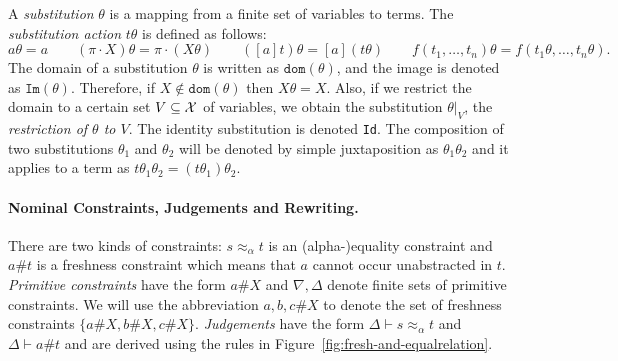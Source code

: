 \documentclass[submission,copyright,creativecommons]{eptcs}
\newcommand{\daniele}[1]{\textcolor{cyan}{#1}}
\newcommand{\aleq}{\approx_{\alpha}}
\newcommand{\alert}[1]{\textcolor{red}{#1}}
\theoremstyle{plain}
\theoremstyle{definition}
\newtheorem{definition}[theorem]{Definition}
\theoremstyle{remark}
\begin{document}

A \emph{substitution} $\theta$ is a mapping from a finite set of variables to terms. The \emph{substitution action} $t\theta$ is defined as follows:
$$a\theta = a \qquad (\pi\cdot X)\theta = \pi\cdot(X\theta) \qquad ([a]t)\theta = [a](t\theta) \qquad f(t_1,\ldots, t_n)\theta = f(t_1\theta,\ldots, t_n\theta).$$
The domain of a substitution $\theta$ is written as $\texttt{dom}(\theta)$, and the image is denoted as $\texttt{Im}(\theta)$. Therefore, if $X \not\in \texttt{dom}(\theta)$ then $X\theta = X$. Also, if we restrict the domain to a certain set $V\subseteq {\cal X}$ of variables,  we obtain the substitution $\theta|_V$,  the \emph{restriction of $\theta$ to $V$}.
The identity substitution is denoted {\tt Id}.  The composition of two substitutions $\theta_1$ and $\theta_2$ will be denoted by simple juxtaposition 
as $\theta_1\theta_2$ and it applies to a term as $t\theta_1\theta_2=(t\theta_1)\theta_2$.



     
\paragraph{Nominal Constraints, Judgements and Rewriting.} There are two kinds of constraints: $s\aleq t$ is an (alpha-)equality constraint and $a\#t$ is a freshness constraint which means that $a$ cannot occur unabstracted in $t$. {\em Primitive constraints} have the form $a\#X$ and $\nabla,\Delta$ denote finite sets of primitive constraints. We will use the abbreviation $a,b,c\# X$ to denote the set of freshness constraints $\{a\# X, b\# X, c\# X\}$. {\em Judgements} have the form $\Delta\vdash s\aleq t$ and $\Delta\vdash a\# t$ and are derived using the rules in Figure~\ref{fig:fresh-and-equalrelation}. 
\end{document}
